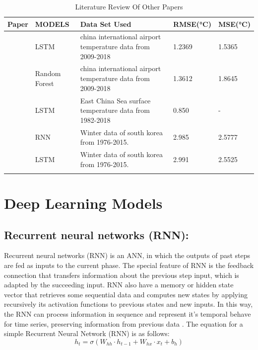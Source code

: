 \documentclass[sn-mathphys,Numbered]{sn-jnl}
\theoremstyle{thmstyleone}
\theoremstyle{thmstyletwo}
\theoremstyle{thmstylethree}
\begin{document}
\begin{table}[h]
\caption{Literature Review Of Other Papers}\label{tab1}%
\begin{tabular}{@{}lllll@{}}
\toprule
Paper & MODELS  & Data Set Used & RMSE(°C) & MSE(°C) \\
\midrule
\cite{li2019deep}    & LSTM   & china international airport temperature data from 2009-2018  &1.2369 &1.5365    \\
\cite{li2019deep}   & Random Forest   & china international airport temperature data from 2009-2018  &1.3612 &1.8645     \\
\cite{xiao2019spatiotemporal}    & LSTM   & East China Sea surface temperature data from 1982-2018   & 0.850 & -  \\
\cite{thi2020deep}  & RNN       & Winter data of south korea from 1976-2015.     & 2.985      & 2.5777    \\
\cite{thi2020deep}  & LSTM    & Winter data of south korea from 1976-2015.      & 2.991       & 2.5525 \\
\botrule
\end{tabular}
\end{table}
\section{Deep Learning Models}

\subsection {Recurrent neural networks (RNN):}
Recurrent neural networks (RNN) is an ANN, in which the outputs of past steps are fed as inputs to the current phase. The special feature of RNN is the feedback connection that transfers information about the previous step input, which is adapted by the succeeding input. RNN also have a memory or hidden state vector that retrieves some sequential data and computes new states by applying recursively its activation functions to previous states and new inputs. In this way, the RNN can process information in sequence and represent it's temporal behave for  time series, preserving information from previous data \cite{thi2020deep}.
The equation for a simple Recurrent Neural Network (RNN) is as follows:
\begin{equation}
h_t=\sigma(W_{hh} \cdot h_{t-1} + W_{hx} \cdot x_t + b_h)
\end{equation}
\end{document}
